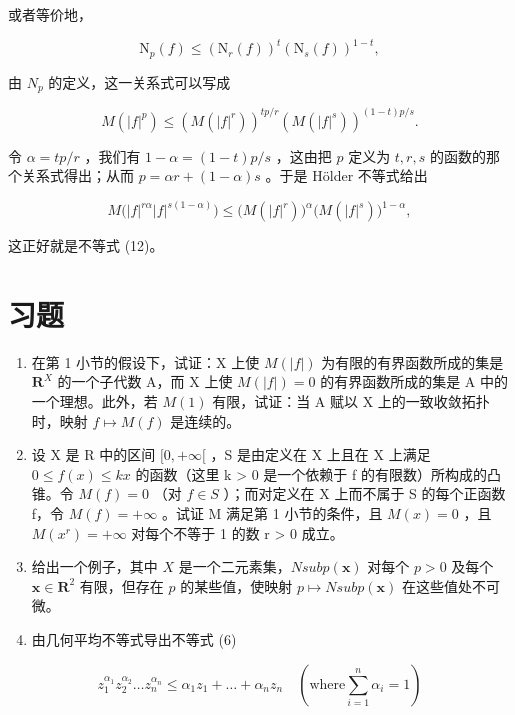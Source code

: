 或者等价地，

\[
\mathrm{N} _ {p} (f) \leqslant \left(\mathrm{N} _ {r} (f)\right) ^ {t} \left(\mathrm{N} _ {s} (f)\right) ^ {1 - t},\tag{11}
\]

由 \(N_{p}\) 的定义，这一关系式可以写成

\[
M (| f | ^ {p}) \leqslant \left(M (| f | ^ {r})\right) ^ {t p / r} \left(M (| f | ^ {s})\right) ^ {(1 - t) p / s}.\tag{12}
\]

令 \(\alpha = tp / r\) ，我们有 \(1 - \alpha = (1 - t)p / s\) ，这由把 \(p\) 定义为 \(t, r, s\) 的函数的那个关系式得出；从而 \(p = \alpha r + (1 - \alpha)s\) 。于是 Hölder 不等式给出

\[
M \big (| f | ^ {r \alpha} | f | ^ {s (1 - \alpha)} \big) \leqslant \big (M (| f | ^ {r}) \big) ^ {\alpha} \big (M (| f | ^ {s}) \big) ^ {1 - \alpha},
\]

这正好就是不等式 (12)。

\chapter*{习题}
{}

\begin{enumerate}
\def\labelenumi{\arabic{enumi})}
\item
  在第 1 小节的假设下，试证：X 上使 \(M(|f|)\) 为有限的有界函数所成的集是 \(\mathbf{R}^X\) 的一个子代数 A，而 X 上使 \(M(|f|) = 0\) 的有界函数所成的集是 A 中的一个理想。此外，若 \(M(1)\) 有限，试证：当 A 赋以 X 上的一致收敛拓扑时，映射 \(f \mapsto M(f)\) 是连续的。
\item
  设 X 是 R 中的区间 \([0, +\infty[\) ，S 是由定义在 X 上且在 X 上满足 \(0 \leqslant f(x) \leqslant kx\) 的函数（这里 k \textgreater{} 0 是一个依赖于 f 的有限数）所构成的凸锥。令 \(M(f) = 0\) （对 \(f \in S\) ）；而对定义在 X 上而不属于 S 的每个正函数 f，令 \(M(f) = +\infty\) 。试证 M 满足第 1 小节的条件，且 \(M(x) = 0\) ，且 \(M(x^{r}) = +\infty\) 对每个不等于 1 的数 r \textgreater{} 0 成立。
\item
  给出一个例子，其中 \(X\) 是一个二元素集，\(N sub p(\mathbf{x})\) 对每个 \(p > 0\) 及每个 \(\mathbf{x} \in \mathbf{R}^2\) 有限，但存在 \(p\) 的某些值，使映射 \(p \mapsto N sub p(\mathbf{x})\) 在这些值处不可微。
\item
  由几何平均不等式导出不等式 (6)
\end{enumerate}

\[
z _ {1} ^ {\alpha_ {1}} z _ {2} ^ {\alpha_ {2}} \dots z _ {n} ^ {\alpha_ {n}} \leqslant \alpha_ {1} z _ {1} + \dots + \alpha_ {n} z _ {n} \quad (\text {where} \sum_ {i = 1} ^ {n} \alpha_ {i} = 1)
\]

